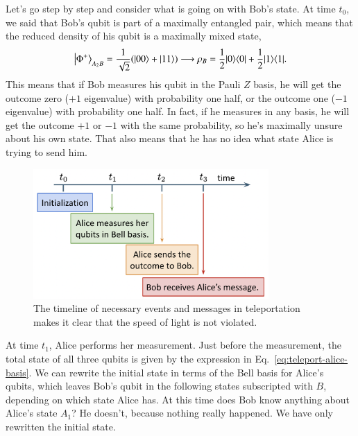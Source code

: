 Let's go step by step and consider what is going on with Bob's state. At time $t_0$, we said that Bob's qubit is part of a maximally entangled pair, which means that the reduced density of his qubit is a maximally mixed state,
\begin{equation}
\left|\Phi^{+}\right\rangle_{A_2 B}=\frac{1}{\sqrt{2}}(|00\rangle+|11\rangle) \longrightarrow \rho_B=\frac{1}{2}|0 \rangle \langle 0| +\frac{1}{2}|1 \rangle \langle 1|.
\end{equation}
This means that if Bob measures his qubit in the Pauli $Z$ basis, he will get the outcome zero ($+1$ eigenvalue) with probability one half, or the outcome one ($-1$ eigenvalue) with probability one half. In fact, if he measures in any basis, he will get the outcome $+1$ or $-1$ with the same probability, so he's maximally unsure about his own state. That also means that he has no idea what state Alice is trying to send him.
\begin{figure}[H]
    \centering
    \includegraphics[width=0.8\textwidth]{lesson8/teleportation-timeline.png}
        \caption{The timeline of necessary events and messages in teleportation makes it clear that the speed of light is not violated.}
    \label{fig:teleportation-timeline}
\end{figure}

At time $t_1$, Alice performs her measurement. Just before the measurement, the total state of all three qubits is given by the expression in Eq.~\ref{eq:teleport-alice-basis}. We can rewrite the initial state in terms of the Bell basis for Alice's qubits, which leaves Bob's qubit in the following states subscripted with $B$, depending on which state Alice has. At this time does Bob know anything about Alice's state $A_1$? He doesn't, because nothing really happened. We have only rewritten the initial state.

